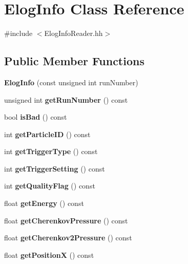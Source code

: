 \section{Elog\-Info Class Reference}
\label{classElogInfo}


{\ttfamily \#include $<$Elog\-Info\-Reader.\-hh$>$}

\subsection*{Public Member Functions}
\begin{DoxyCompactItemize}
\item 
{\bf Elog\-Info} (const unsigned int run\-Number)
\item 
unsigned int {\bfseries get\-Run\-Number} () const \label{classElogInfo_a52d1fea6630ad9e76b12d848fbbc7c1d}

\item 
bool {\bfseries is\-Bad} () const \label{classElogInfo_a1f318555624df3440e8ad52bdc6c0ad7}

\item 
int {\bfseries get\-Particle\-I\-D} () const \label{classElogInfo_a65a4860d6877261f3cf6f07c0427e415}

\item 
int {\bfseries get\-Trigger\-Type} () const \label{classElogInfo_ab9d441d35ba862db3a273833652cf4b2}

\item 
int {\bfseries get\-Trigger\-Setting} () const \label{classElogInfo_a8f9ff13d7751586cb9bd9990e348c841}

\item 
int {\bfseries get\-Quality\-Flag} () const \label{classElogInfo_af920505072c4457db2f369b8cd175d3c}

\item 
float {\bfseries get\-Energy} () const \label{classElogInfo_a3410b359b553cf0160713c54e626264b}

\item 
float {\bfseries get\-Cherenkov\-Pressure} () const \label{classElogInfo_a442a3f0e778df9c12d1d30bbfe827513}

\item 
float {\bfseries get\-Cherenkov2\-Pressure} () const \label{classElogInfo_a7480ac73baf5c1298732f6292f7e7392}

\item 
float {\bfseries get\-Position\-X} () const \label{classElogInfo_ae561116252b199a8179bfa64f84077a7}


\end{DoxyCompactItemize}

